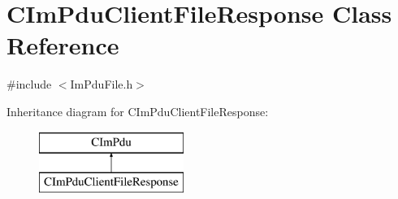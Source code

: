 \hypertarget{class_c_im_pdu_client_file_response}{}\section{C\+Im\+Pdu\+Client\+File\+Response Class Reference}
\label{class_c_im_pdu_client_file_response}


{\ttfamily \#include $<$Im\+Pdu\+File.\+h$>$}

Inheritance diagram for C\+Im\+Pdu\+Client\+File\+Response\+:\begin{figure}[H]
\begin{center}
\leavevmode
\includegraphics[height=2.000000cm]{class_c_im_pdu_client_file_response}
\end{center}
\end{figure}

